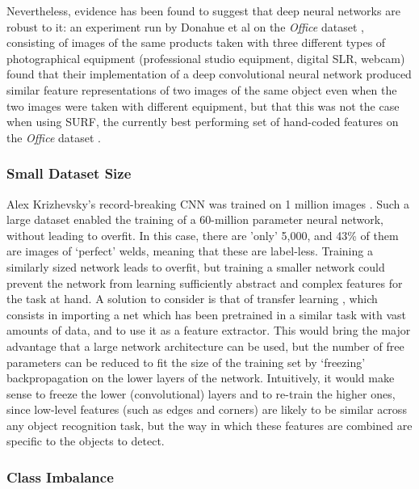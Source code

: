 \documentclass[a4paper,11pt]{article}
\begin{document}
Nevertheless, evidence has been found to suggest that deep neural networks are robust to it: an experiment run by Donahue et al on the \textit{Office} dataset \cite{office}, consisting of images of the same products taken with three different types of photographical equipment (professional studio equipment, digital SLR, webcam) found that their implementation of a deep convolutional neural network produced similar feature representations of two images of the same object even when the two images were taken with different equipment, but that this was not the case when using SURF, the currently best performing set of hand-coded features on the \textit{Office} dataset \cite{surf}. \\


\subsubsection{Small Dataset Size}

Alex Krizhevsky's record-breaking CNN was trained on 1 million images \cite{krizhevsky}. Such a large dataset enabled the training of a 60-million parameter neural network, without leading to overfit. In this case, there are 'only' 5,000, and 43\% of them are images of `perfect' welds, meaning that these are label-less. Training a similarly sized network leads to overfit, but training a smaller network could prevent the network from learning sufficiently abstract and complex features for the task at hand. A solution to consider is that of transfer learning \cite{transfer-learning}, which consists in importing a net which has been pretrained in a similar task with vast amounts of data, and to use it as a feature extractor. This would bring the major advantage that a large network architecture can be used, but the number of free parameters can be reduced to fit the size of the training set by `freezing' backpropagation on the lower layers of the network. Intuitively, it would make sense to freeze the lower (convolutional) layers and to re-train the higher ones, since low-level features (such as edges and corners) are likely to be similar across any object recognition task, but the way in which these features are combined are specific to the objects to detect.

\subsubsection{Class Imbalance}
\end{document}
